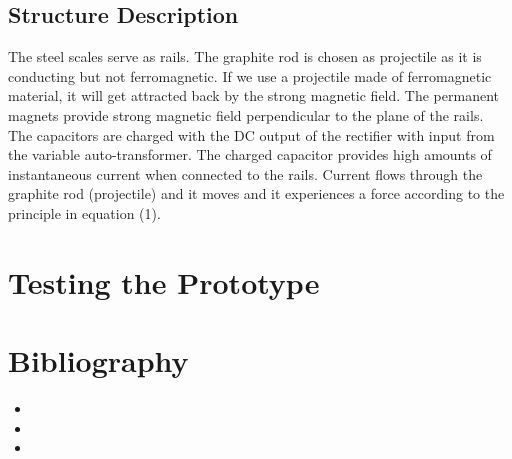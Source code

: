 \documentclass[twocolumn]{article}
\begin{document}
\subsection*{Structure Description}
\hspace{10mm} The steel scales serve as rails. The graphite rod is chosen as projectile as it is conducting but not ferromagnetic. If we use a projectile made of ferromagnetic material, it will get attracted back by the strong magnetic field. The permanent magnets provide strong magnetic field perpendicular to the plane of the rails. The capacitors are charged with the DC output of the rectifier with input from the variable auto-transformer. The charged capacitor provides high amounts of instantaneous current when connected to the rails. Current flows through the graphite rod (projectile) and it moves and it experiences a force according to the principle in equation (1).

\section{Testing the Prototype}






\section{Bibliography} 
\begin{itemize}
\item 

\item 

\item

\end{itemize}
\end{document}
